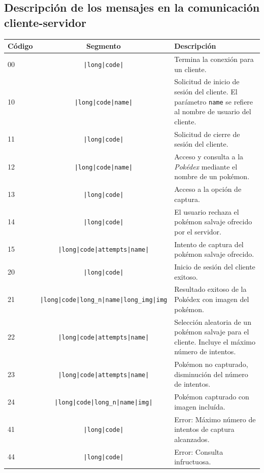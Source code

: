 \documentclass[12pt]{article}
\begin{document}
\subsection{Descripción de los mensajes en la comunicación cliente-servidor}
\begin{center}
  \begin{tabular}{|l|c|p{5.9cm}|}
    \hline
    Código & Segmento & Descripción \\ \hline
    \hline
    00 & \texttt{|long|code|} & Termina la conexión para un cliente. \\ \hline
    10 & \texttt{|long|code|name|} & Solicitud de inicio de sesión del cliente. El parámetro \texttt{name} se refiere al nombre de usuario del cliente. \\ \hline
    11 & \texttt{|long|code|} & Solicitud de cierre de sesión del cliente. \\ \hline
    12 & \texttt{|long|code|name|} & Acceso y consulta a la \textit{Pokédex} mediante el nombre de un pokémon. \\ \hline
    13 & \texttt{|long|code|} & Acceso a la opción de captura. \\ \hline
    14 & \texttt{|long|code|} & El usuario rechaza el pokémon salvaje ofrecido por el servidor. \\ \hline
    15 & \texttt{|long|code|attempts|name|} & Intento de captura del pokémon salvaje ofrecido. \\ \hline %
    \hline
    20 & \texttt{|long|code|} & Inicio de sesión del cliente exitoso. \\ \hline
    21 & \texttt{|long|code|long\_n|name|long\_img|img} & Resultado exitoso de la Pokédex con imagen del pokémon. \\ \hline %
    22 & \texttt{|long|code|attempts|name|} & Selección aleatoria de un pokémon salvaje para el cliente. Incluye el máximo número de intentos. \\ \hline
    23 & \texttt{|long|code|attempts|name|} & Pokémon no capturado, disminución del número de intentos. \\ \hline
    24 & \texttt{|long|code|long\_n|name|img|} & Pokémon capturado con imagen incluída. \\ \hline \hline
    41 & \texttt{|long|code|} & Error: Máximo número de intentos de captura alcanzados. \\ \hline
    44 & \texttt{|long|code|} & Error: Consulta infructuosa. \\ \hline
  \end{tabular}
\end{center}
\end{document}
